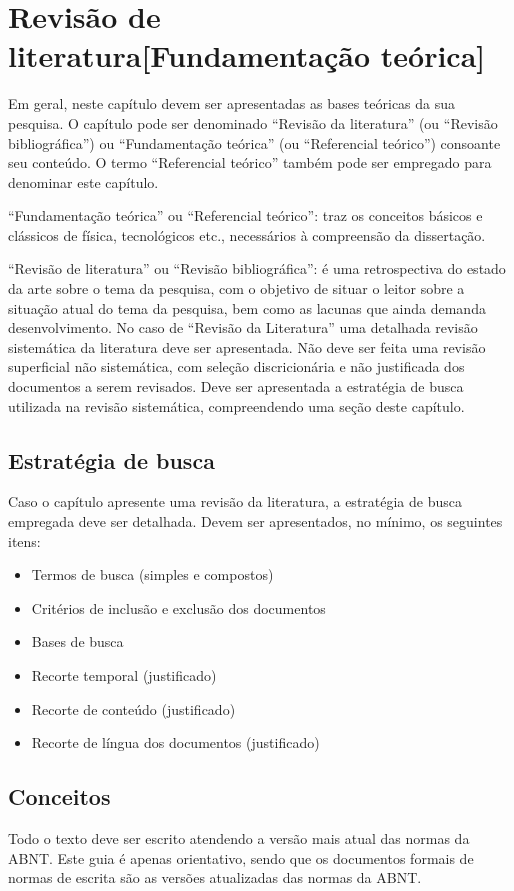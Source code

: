 \chapter{Revisão de literatura[Fundamentação teórica]}
Em geral, neste capítulo devem ser apresentadas as bases teóricas da sua pesquisa. O capítulo pode ser denominado “Revisão da literatura” (ou “Revisão bibliográfica”) ou “Fundamentação teórica” (ou “Referencial teórico”) consoante seu conteúdo. O termo “Referencial teórico” também pode ser empregado para denominar este capítulo.

“Fundamentação teórica” ou “Referencial teórico”: traz os conceitos básicos e clássicos de física, tecnológicos etc., necessários à compreensão da dissertação.

“Revisão de literatura” ou “Revisão bibliográfica”: é uma retrospectiva do estado da arte sobre o tema da pesquisa, com o objetivo de situar o leitor sobre a situação atual do tema da pesquisa, bem como as lacunas que ainda demanda desenvolvimento. No caso de “Revisão da Literatura” uma detalhada revisão sistemática da literatura deve ser apresentada. Não deve ser feita uma revisão superficial não sistemática, com seleção discricionária e não justificada dos documentos a serem revisados. Deve ser apresentada a estratégia de busca utilizada na revisão sistemática, compreendendo uma seção deste capítulo.

\section{Estratégia de busca}
Caso o capítulo apresente uma revisão da literatura, a estratégia de busca empregada deve ser detalhada. Devem ser apresentados, no mínimo, os seguintes itens:
\begin{itemize}
    \item Termos de busca (simples e compostos)
    \item Critérios de inclusão e exclusão dos documentos
    \item Bases de busca
    \item Recorte temporal (justificado)
    \item Recorte de conteúdo (justificado)
    \item Recorte de língua dos documentos (justificado)
\end{itemize}

\section{Conceitos}
Todo o texto deve ser escrito atendendo a versão mais atual das normas da ABNT. Este guia é apenas orientativo, sendo que os documentos formais de normas de escrita são as versões atualizadas das normas da ABNT.

